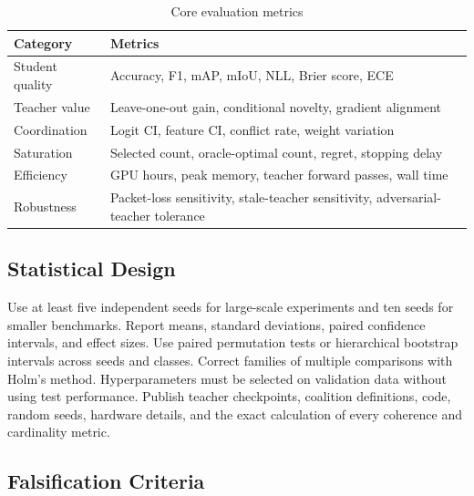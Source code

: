 \documentclass[10pt,twocolumn,a4paper]{article}
\begin{document}
\begin{table}[t]
\caption{Core evaluation metrics}
\label{tab:metrics}
\centering
\footnotesize
\begin{tabularx}{\columnwidth}{@{}p{}X@{}}
\toprule
Category & Metrics \\
\midrule
Student quality & Accuracy, F1, mAP, mIoU, NLL, Brier score, ECE \\
Teacher value & Leave-one-out gain, conditional novelty, gradient alignment \\
Coordination & Logit CI, feature CI, conflict rate, weight variation \\
Saturation & Selected count, oracle-optimal count, regret, stopping delay \\
Efficiency & GPU hours, peak memory, teacher forward passes, wall time \\
Robustness & Packet-loss sensitivity, stale-teacher sensitivity, adversarial-teacher tolerance \\
\bottomrule
\end{tabularx}
\end{table}

\subsection{Statistical Design}

Use at least five independent seeds for large-scale experiments and ten seeds for smaller benchmarks. Report means, standard deviations, paired confidence intervals, and effect sizes. Use paired permutation tests or hierarchical bootstrap intervals across seeds and classes. Correct families of multiple comparisons with Holm's method. Hyperparameters must be selected on validation data without using test performance. Publish teacher checkpoints, coalition definitions, code, random seeds, hardware details, and the exact calculation of every coherence and cardinality metric.

\subsection{Falsification Criteria}
\end{document}
